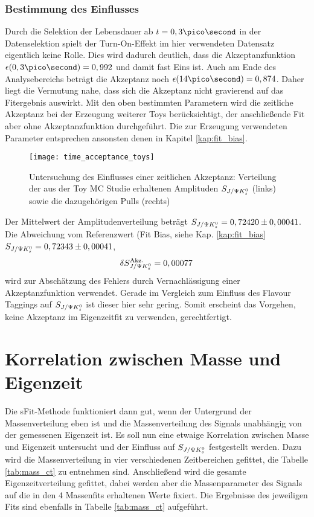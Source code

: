 \subsubsection{Bestimmung des Einflusses}
Durch die Selektion der Lebensdauer ab $t = 0,3\ps$ in der Datenselektion spielt der Turn-On-Effekt im hier verwendeten Datensatz eigentlich keine Rolle. Dies wird dadurch deutlich, dass die Akzeptanzfunktion $\epsilon(0,3\ps) = 0,992$ und damit fast Eins ist. Auch am Ende des Analysebereichs beträgt die Akzeptanz noch $\epsilon(14\ps) = 0,874$. Daher liegt die Vermutung nahe, dass sich die Akzeptanz nicht gravierend auf das Fitergebnis auswirkt. Mit den oben bestimmten Parametern wird die zeitliche Akzeptanz bei der Erzeugung weiterer Toys berücksichtigt, der anschließende Fit aber ohne Akzeptanzfunktion durchgeführt. Die zur Erzeugung verwendeten Parameter entsprechen ansonsten denen in Kapitel \ref{kap:fit_bias}.

\begin{figure}[hptb]
\centering
\texttt{[image: time\_acceptance\_toys]}
\caption{Untersuchung des Einflusses einer zeitlichen Akzeptanz: Verteilung der aus der Toy MC Studie erhaltenen Amplituden $S_{J/\Psi K_s^0}$ (links) sowie die dazugehörigen Pulls (rechts)}
\label{fig:toys_acceptance}
\end{figure}

Der Mittelwert der Amplitudenverteilung beträgt $S_{J/\Psi K_s^0} = 0,72420 \pm 0,00041$. Die Abweichung vom Referenzwert (Fit Bias, siehe Kap. \ref{kap:fit_bias} $S_{J/\Psi K_s^0} = 0,72343 \pm 0,00041$,
\begin{align}
\delta S_{J/\Psi K_s^0}^{\text{Akz.}} = 0,00077\,
\end{align}
wird zur Abschätzung des Fehlers durch Vernachlässigung einer Akzeptanzfunktion verwendet. Gerade im Vergleich zum Einfluss des Flavour Taggings auf $S_{J/\Psi K_s^0}$ ist dieser hier sehr gering. Somit erscheint das Vorgehen, keine Akzeptanz im Eigenzeitfit zu verwenden, gerechtfertigt.


\section{Korrelation zwischen Masse und Eigenzeit}
Die sFit-Methode funktioniert dann gut, wenn der Untergrund der Massenverteilung eben ist und die Massenverteilung des Signals unabhängig von der gemessenen Eigenzeit ist. Es soll nun eine etwaige Korrelation zwischen Masse und Eigenzeit untersucht und der Einfluss auf $S_{J/\Psi K_s^0}$ festgestellt werden. Dazu wird die Massenverteilung in vier verschiedenen Zeitbereichen gefittet, die Tabelle \ref{tab:mass_ct} zu entnehmen sind. Anschließend wird die gesamte Eigenzeitverteilung gefittet, dabei werden aber die Massenparameter des Signals auf die in den 4 Massenfits erhaltenen Werte fixiert. Die Ergebnisse des jeweiligen Fits sind ebenfalls in Tabelle \ref{tab:mass_ct} aufgeführt.

